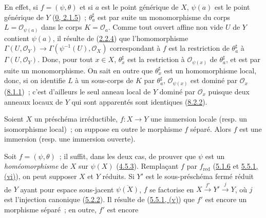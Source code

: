 En effet, si $f=(\psi,\theta)$ et si $a$ est le point générique de $X$,
$\psi(a)$ est le point générique de $Y$
(\hyperref[0.2.1.5-fr]{0, 2.1.5})~; $\theta_a^\sharp$ est par suite un
monomorphisme du corps $L=\mathscr{O}_{\psi(a)}$ dans le corps
$K=\mathscr{O}_a$. Comme tout ouvert affine non vide $U$ de $Y$ contient
$\psi(a)$, il résulte de (\hyperref[I.2.2.4-fr]{2.2.4}) que l'homomorphisme
$\Gamma(U,\mathscr{O}_Y)\to\Gamma(\psi^{-1}(U),\mathscr{O}_X)$ correspondant
à $f$ est la restriction de $\theta_a^\sharp$ à
$\Gamma(U,\mathscr{O}_Y)$. Donc, pour tout $x\in X$,
$\theta_x^\sharp$ est la restriction à $\mathscr{O}_{\psi(x)}$ de
$\theta_a^\sharp$, et est par suite un monomorphisme. On sait en outre que
$\theta_x^\sharp$ est un homomorphisme local, donc, si on identifie $L$ à un
sous-corps de $K$ par $\theta_a^\sharp$, $\mathscr{O}_{\psi(x)}$ est dominé
par $\mathscr{O}_x$ (\hyperref[I.8.1.1-fr]{8.1.1})~; c'est d'ailleurs le seul
anneau local de $Y$ dominé par $\mathscr{O}_x$ puisque deux anneaux locaux de
$Y$ qui sont apparentés sont identiques
(\hyperref[I.8.2.2-fr]{8.2.2}).

\begin{proposition}[8.2.8]
\label{I.8.2.8-fr}
Soient $X$ un préschéma irréductible, $f:X\to Y$ une immersion locale
(resp. un isomorphisme local)~; on suppose en outre le morphisme $f$ séparé.
Alors $f$ est une immersion (resp. une immersion ouverte).
\end{proposition}

Soit $f=(\psi,\theta)$~; il suffit, dans les deux cas, de prouver que $\psi$
est un \emph{homéomorphisme} de $X$ sur $\psi(X)$
(\hyperref[I.4.5.3-fr]{4.5.3}). Remplaçant $f$ par $f_{\mathrm{red}}$
(\hyperref[I.5.1.6-fr]{5.1.6} et
\hyperref[I.5.5.1-fr]{5.5.1, (vi)}), on peut supposer $X$ et $Y$ réduits. Si
$Y'$ est le sous-préschéma fermé réduit de $Y$ ayant pour espace sous-jacent
$\overline{\psi(X)}$, $f$ se factorise en
$X\xrightarrow{f'}Y'\xrightarrow{j}Y$, où $j$ est l'injection canonique
(\hyperref[I.5.2.2-fr]{5.2.2}). Il résulte de
(\hyperref[I.5.5.1-fr]{5.5.1, (v)}) que $f'$ est encore un morphisme séparé~;
en outre, $f'$ est encore

